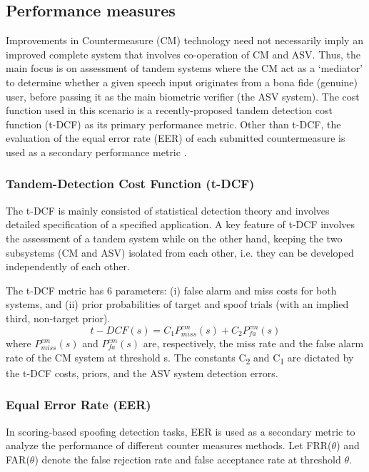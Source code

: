 \documentclass[a4paper]{article}
\begin{document}
\subsection{Performance measures}
    Improvements in Countermeasure (CM) technology need not necessarily imply an improved complete system that involves co-operation of CM and ASV. Thus, the main focus is on assessment of tandem systems where the CM act as a `mediator' to determine whether a given speech input originates from a bona fide (genuine) user, before passing it as the main biometric verifier (the ASV system). The cost function used in this scenario is a recently-proposed tandem detection cost function (t-DCF) \cite{tdcf} as its primary performance metric. Other than t-DCF, the evaluation of the equal error rate (EER) of each submitted countermeasure is used as a secondary performance metric \cite{evaluation}. 

\subsubsection{Tandem-Detection Cost Function (t-DCF)}
    The t-DCF \cite{tdcf} is mainly consisted of statistical detection theory and involves detailed specification of a specified application. A key feature of t-DCF involves the assessment of a tandem system while on the other hand, keeping the two subsystems (CM and ASV) isolated from each other, i.e. they can be developed independently of each other.
 
    The t-DCF metric has 6 parameters: (i) false alarm and miss costs for both systems, and (ii) prior probabilities of target and spoof trials (with an implied third, non-target prior).
    \begin{equation}
        t-DCF(s) = C_{1}P_{miss}^{cm}(s) + C_{2}P_{fa}^{cm}(s)
    \end{equation}
    where $P_{miss}^{cm}(s)$ and $P_{fa}^{cm}(s)$ are, respectively, the miss rate and the false alarm rate of the CM system at threshold s. The constants C\textsubscript{2} and C\textsubscript{1} are dictated by the t-DCF costs, priors, and the ASV system detection errors.
    
\subsubsection{Equal Error Rate (EER)}
    
    In scoring-based spoofing detection tasks, EER is used as a secondary metric to analyze the performance of different counter measures methods. Let FRR($\theta$) and FAR($\theta$) denote the false rejection rate and false acceptance rate at threshold $\theta$.
\end{document}

